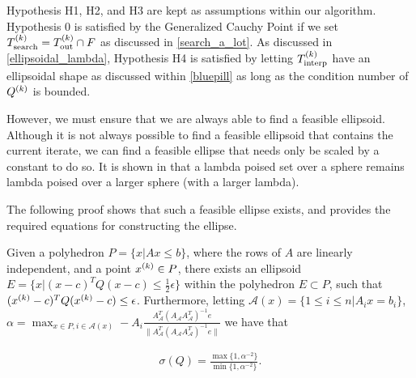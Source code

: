 Hypothesis H1, H2, and H3 are kept as assumptions within our algorithm.
Hypothesis 0 is satisfied by the Generalized Cauchy Point \cite{Conn:2000:TM:357813} if we set ${T_{\text{search}}^{(k)}} = {T_{\text{out}}^{(k)}} \cap {F}$ as discussed in \cref{search_a_lot}.
As discussed in \cref{ellipsoidal_lambda}, Hypothesis H4 is satisfied by letting ${T_{\text{interp}}^{(k)}}$ have an ellipsoidal shape as discussed within \cref{bluepill} as long as the condition number of ${Q^{(k)}}$ is bounded.

However, we must ensure that we are always able to find a feasible ellipsoid.
Although it is not always possible to find a feasible ellipsoid that contains the current iterate,
we can find a feasible ellipse that needs only be scaled by a constant to do so.
It is shown in \cite{Billups_Larson_2013} that a lambda poised set over a sphere remains lambda poised over a larger sphere (with a larger lambda).

The following proof shows that such a feasible ellipse exists, and provides the required equations for constructing the ellipse.

\begin{theorem}
Given a polyhedron $P = \{x | Ax \le b \}$, where the rows of $A$ are linearly independent, and a point ${x^{(k)}} \in P$,
there exists an ellipsoid $E = \{x | (x - c)^TQ(x - c) \le \frac 1 2 \epsilon \}$ within the polyhedron $E \subset P$,
such that $({x^{(k)}} - c)^TQ({x^{(k)}} - c) \le \epsilon$.
Furthermore, letting $\mathcal A(x) = \{1\le i\le n | A_ix = b_i\}$, $
\alpha = \max_{x \in P, i \in \mathcal A(x)} -A_i\frac{A_{\mathcal A}^T(A_{\mathcal A}A_{\mathcal A}^T)^{-1} e}{\|A_{\mathcal A}^T(A_{\mathcal A}A_{\mathcal A}^T)^{-1} e\|}$ we have that

\begin{align*}
\sigma(Q) = \frac{\max\{1, \alpha^{-2}\}}{\min\{1, \alpha^{-2}\}}.
\end{align*}

\end{theorem}


